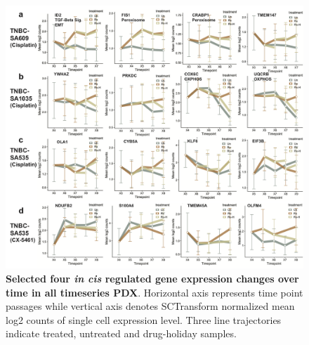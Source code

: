 \begin{figure}
\centering
 \includegraphics[width=\textwidth]{Figures/chap5/old/incisgenelinetrajectories.png}
\caption[Four \textit{in cis} gene expression changed over time]
	{\small
	 \textbf{Selected four \textit{in cis} regulated gene expression changes over time in all timeseries PDX}.
	Horizontal axis represents time point passages while vertical axis denotes SCTransform normalized mean log2 counts of single cell expression level. Three line trajectories indicate treated, untreated and drug-holiday samples. }
	\label{fig:incisgenelinetrajectories}
\end{figure}

